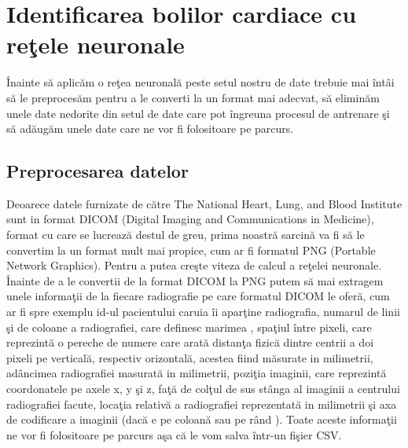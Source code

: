 \chapter{Identificarea bolilor cardiace cu re\c{t}ele neuronale}

\^{I}nainte s\u{a} aplic\u{a}m o re\c{t}ea neuronal\u{a} peste setul nostru de date trebuie mai \^{i}nt\^{a}i s\u{a} le preproces\u{a}m pentru a le converti la un format mai adecvat, s\u{a} elimin\u{a}m unele date nedorite din setul de date care pot \^{i}ngreuna procesul de antrenare \c{s}i s\u{a} ad\u{a}ug\u{a}m unele date care ne vor fi folositoare pe parcurs.

\section{Preprocesarea datelor}

Deoarece datele furnizate de c\u{a}tre The National Heart, Lung, and Blood Institute sunt in format DICOM (Digital Imaging and Communications in Medicine), format cu care se lucreaz\u{a} destul de greu, prima noastr\u{a} sarcin\u{a} va fi s\u{a} le convertim la un format mult mai propice, cum ar fi formatul PNG (Portable Network Graphics). Pentru a putea cre\c{s}te viteza de calcul a re\c{t}elei neuronale. \^{I}nainte de a le convertii de la format DICOM la PNG putem s\u{a} mai extragem unele informa\c{t}ii de la fiecare radiografie pe care formatul DICOM le ofer\u{a}, cum ar fi spre exemplu  id-ul pacientului caruia \^{i}i apar\c{t}ine radiografia, numarul de linii \c{s}i de coloane a radiografiei, care definesc marimea , spa\c{t}iul \^{i}ntre pixeli, care reprezint\u{a} o pereche de numere care arat\u{a} distan\c{t}a fizic\u{a} dintre centrii a doi pixeli pe vertical\u{a}, respectiv orizontal\u{a}, acestea fiind m\u{a}surate in milimetrii, ad\^{a}ncimea radiografiei masurat\u{a} in milimetrii, pozi\c{t}ia imaginii, care reprezint\u{a} coordonatele pe axele x, y \c{s}i z, fa\c{t}\u{a} de col\c{t}ul de sus st\^{a}nga al imaginii a centrului  radiografiei facute, loca\c{t}ia relativ\u{a} a radiografiei reprezentat\u{a} in milimetrii \c{s}i axa de codificare a imaginii (dac\u{a} e pe coloan\u{a} sau pe r\^{a}nd ). Toate aceste informa\c{t}ii ne vor fi folositoare pe parcurs a\c{s}a c\u{a} le vom salva \^{i}ntr-un fi\c{s}ier CSV.

\par

